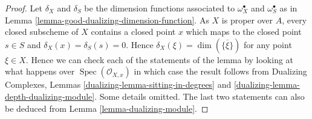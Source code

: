 \documentclass[10pt,a4paper]{amsart}
\theoremstyle{plain}
\theoremstyle{definition}
\theoremstyle{remark}
\numberwithin{equation}{subsection}
\def\Spec{\mathop{\mathrm{Spec}}}
\begin{document}
\begin{proof}
Let $\delta_X$ and $\delta_S$ be the dimension functions associated to
$\omega_X^\bullet$ and $\omega_S^\bullet$ as in
Lemma \ref{lemma-good-dualizing-dimension-function}.
As $X$ is proper over $A$, every closed subscheme of $X$ contains
a closed point $x$ which maps to the closed point $s \in S$
and $\delta_X(x) = \delta_S(s) = 0$. Hence
$\delta_X(\xi) = \dim(\overline{\{\xi\}})$ for any point
$\xi \in X$. Hence we can check each of
the statements of the lemma by looking at what happens over
$\Spec(\mathcal{O}_{X, x})$ in which case the result follows
from Dualizing Complexes, Lemmas \ref{dualizing-lemma-sitting-in-degrees} and
\ref{dualizing-lemma-depth-dualizing-module}.
Some details omitted.
The last two statements can also be deduced from
Lemma \ref{lemma-dualizing-module}.
\end{proof}
\end{document}
